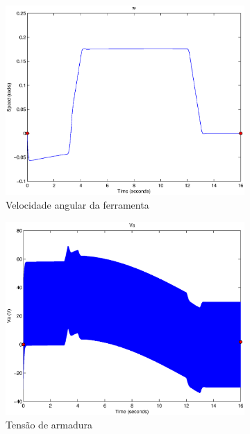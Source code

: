 \documentclass{article}
\begin{document}
\begin{figure}[H]
\begin{subfigure}{0.3\textwidth}
		\includegraphics[width=\linewidth]{matlab/w4}
		\caption{Velocidade angular da ferramenta}
	\end{subfigure}
	\begin{subfigure}{0.3\textwidth}
		\includegraphics[width=\linewidth]{matlab/va4}
		\caption{Tensão de armadura}
	\end{subfigure}
	\begin{subfigure}{0.3\textwidth}

\end{subfigure}
\end{figure}
\end{document}
